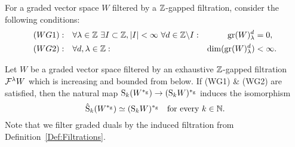 \documentclass[\MainFolder/Text.tex]{subfiles}
\begin{document}
For a graded vector space $W$ filtered by a $\mathbb{Z}$-gapped filtration, consider the following conditions:
\begin{equation}\label{Eq:WGs}
\begin{aligned}
(WG1):\quad& \forall \lambda\in \mathbb{Z}\ \exists I \subset \mathbb{Z}, |I|<\infty\ \forall d\in \mathbb{Z}\backslash I:& \operatorname{\mathrm{gr}}(W)_\lambda^d &= 0, \\
(WG2):\quad & \forall d, \lambda\in \mathbb{Z}:& \dim(\operatorname{\mathrm{gr}}(W)_\lambda^d) &< \infty.
\end{aligned}
\end{equation}

\begin{Lemma}\label{Lem:Terrible}
Let $W$ be a graded vector space filtered by an exhaustive $\mathbb{Z}$-gapped filtration~$\mathcal{F}^\lambda W$ which is increasing and bounded from below. If (WG1) \& (WG2) are satisfied, then the natural map $\mathrm{S}_k(W^{*_{\mathrm{g}}}) \rightarrow (\mathrm{S}_k W)^{*_{\mathrm{g}}}$ induces the isomorphism 
$$ \hat{\mathrm{S}}_k(W^{*_{\mathrm{g}}}) \simeq  (\mathrm{S}_k W)^{*_{\mathrm{g}}} \quad\text{for every }k\in \mathbb{N}.$$
Note that we filter graded duals by the induced filtration from Definition~\ref{Def:Filtrations}.
\end{Lemma}
\end{document}
